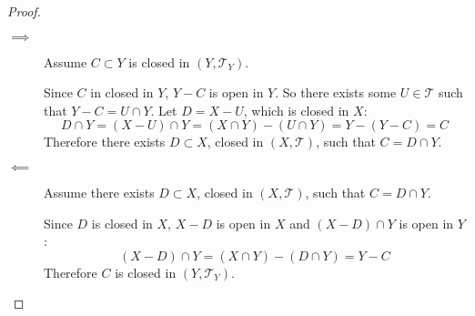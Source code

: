 \documentclass[letterpaper,12pt,fleqn]{article}
\newcommand{\T}{\mathscr{T}}
\begin{document}
\begin{proof}
  \begin{description}
  \item[]
  \item[\(\implies\)] Assume \(C\subset Y\) is closed in \((Y,\T_Y)\).

    Since \(C\) in closed in \(Y\), \(Y-C\) is open in \(Y\).  So there exists some \(U\in\T\) such that
    \(Y-C=U\cap Y\).  Let \(D=X-U\), which is closed in \(X\):
    \[D\cap Y=(X-U)\cap Y=(X\cap Y)-(U\cap Y)=Y-(Y-C)=C\]
    Therefore there exists \(D\subset X\), closed in \((X,\T)\), such that \(C=D\cap Y\).

  \item[\(\impliedby\)] Assume there exists \(D\subset X\), closed in \((X,\T)\), such that \(C=D\cap Y\).

    Since \(D\) is closed in \(X\), \(X-D\) is open in \(X\) and \((X-D)\cap Y\) is open in \(Y\):
    \[(X-D)\cap Y=(X\cap Y)-(D\cap Y)=Y-C\]
    Therefore \(C\) is closed in \((Y,\T_Y)\).
  \end{description}
\end{proof}
\end{document}

